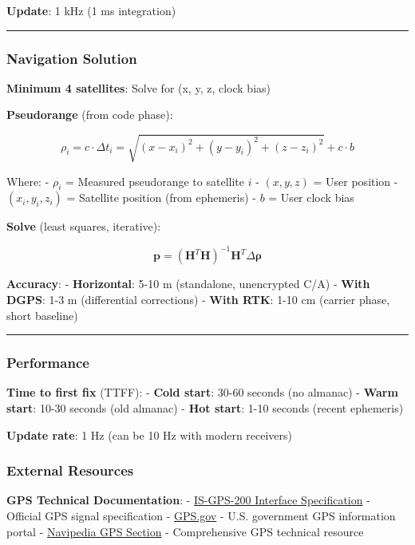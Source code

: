\textbf{Update}: 1 kHz (1 ms integration)

\begin{center}\rule{0.5\linewidth}{0.5pt}\end{center}

\subsubsection{Navigation Solution}\label{navigation-solution}

\textbf{Minimum 4 satellites}: Solve for (x, y, z, clock bias)

\textbf{Pseudorange} (from code phase):

\[
\rho_i = c \cdot \Delta t_i = \sqrt{(x - x_i)^2 + (y - y_i)^2 + (z - z_i)^2} + c \cdot b
\]

Where: - \(\rho_i\) = Measured pseudorange to satellite \(i\) -
\((x, y, z)\) = User position - \((x_i, y_i, z_i)\) = Satellite position
(from ephemeris) - \(b\) = User clock bias

\textbf{Solve} (least squares, iterative):

\[
\mathbf{p} = (\mathbf{H}^T \mathbf{H})^{-1} \mathbf{H}^T \Delta\boldsymbol{\rho}
\]

\textbf{Accuracy}: - \textbf{Horizontal}: 5-10 m (standalone,
unencrypted C/A) - \textbf{With DGPS}: 1-3 m (differential corrections)
- \textbf{With RTK}: 1-10 cm (carrier phase, short baseline)

\begin{center}\rule{0.5\linewidth}{0.5pt}\end{center}

\subsubsection{Performance}\label{performance-3}

\textbf{Time to first fix} (TTFF): - \textbf{Cold start}: 30-60 seconds
(no almanac) - \textbf{Warm start}: 10-30 seconds (old almanac) -
\textbf{Hot start}: 1-10 seconds (recent ephemeris)

\textbf{Update rate}: 1 Hz (can be 10 Hz with modern receivers)

\subsubsection{External Resources}\label{external-resources}

\textbf{GPS Technical Documentation}: -
\href{https://www.gps.gov/technical/icwg/IS-GPS-200M.pdf}{IS-GPS-200
Interface Specification} - Official GPS signal specification -
\href{https://www.gps.gov/}{GPS.gov} - U.S. government GPS information
portal -
\href{https://gssc.esa.int/navipedia/index.php?title=GPS}{Navipedia GPS
Section} - Comprehensive GPS technical resource

